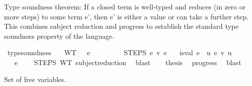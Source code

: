 \begin{isabellebody}
{\isafolddocument}%
%
\isadelimdocument
%
\endisadelimdocument
%
\begin{isamarkuptext}%
Type soundness theorem:
  If a closed term is well-typed and reduces (in zero or more steps)
  to some term e', then e' is either a value or can take a further step.
  This combines subject reduction and progress to establish
  the standard type soundness property of the language.%
\end{isamarkuptext}\isamarkuptrue%
\isamarkupfalse%
\ type{\isacharunderscore}{\kern0pt}soundness{\isacharcolon}{\kern0pt}\isanewline
\ \ \ WT{\isacharcolon}{\kern0pt}\ {\isachardoublequoteopen}{\isacharbrackleft}{\kern0pt}{\isacharbrackright}{\kern0pt}\ {\isasymturnstile}\ e\ {\isacharcolon}{\kern0pt}\ {\isasymtau}{\isachardoublequoteclose}\isanewline
\ \ \ \ \ \ \ STEPS{\isacharcolon}{\kern0pt}\ {\isachardoublequoteopen}e\ {\isasymrightarrow}\isactrlsub v\isactrlsup {\isacharasterisk}{\kern0pt}\ e{\isacharprime}{\kern0pt}{\isachardoublequoteclose}\isanewline
\ \ \ {\isachardoublequoteopen}is{\isacharunderscore}{\kern0pt}val\ e{\isacharprime}{\kern0pt}\ {\isasymor}\ {\isacharparenleft}{\kern0pt}{\isasymexists}u{\isachardot}{\kern0pt}\ e{\isacharprime}{\kern0pt}\ {\isasymrightarrow}\isactrlsub v\ u{\isacharparenright}{\kern0pt}{\isachardoublequoteclose}\isanewline
%
\isadelimproof
%
\endisadelimproof
%
\isatagproof
{}\isamarkupfalse%
\ {\isacharminus}{\kern0pt}\isanewline
\ \ \isamarkupfalse%
\ {\isachardoublequoteopen}{\isacharbrackleft}{\kern0pt}{\isacharbrackright}{\kern0pt}\ {\isasymturnstile}\ e{\isacharprime}{\kern0pt}\ {\isacharcolon}{\kern0pt}\ {\isasymtau}{\isachardoublequoteclose}\ \isamarkupfalse%
\ STEPS\ WT\ subject{\isacharunderscore}{\kern0pt}reduction{\isacharprime}{\kern0pt}\ \isamarkupfalse%
\ blast\isanewline
\ \ \isamarkupfalse%
\ {\isacharquery}{\kern0pt}thesis\ \isamarkupfalse%
\ progress{\isacharprime}{\kern0pt}\ \isamarkupfalse%
\ blast\isanewline
{}\isamarkupfalse%
%
\endisatagproof
{\isafoldproof}%
%
\isadelimproof
%
\endisadelimproof
%
\isadelimdocument
%
\endisadelimdocument
%
\isatagdocument
%
\isamarkuptrue%
%
\endisatagdocument
{\isafolddocument}%
%
\isadelimdocument
%
\endisadelimdocument
%
\begin{isamarkuptext}%
Set of free variables.%
\end{isamarkuptext}\isamarkuptrue%

\end{isabellebody}

